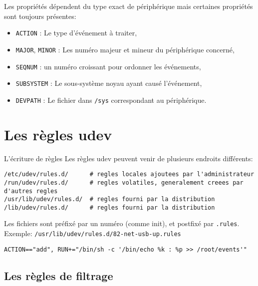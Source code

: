 \documentclass[compress,aspectratio=169]{beamer}
\begin{document}
\begin{frame}[fragile]
Les propriétés dépendent du type exact de périphérique mais certaines propriétés sont toujours présentes:
\begin{itemize}
    \item \texttt{ACTION} : Le type d’événement à traiter,
    \item \texttt{MAJOR}, \texttt{MINOR} : Les numéro majeur et mineur du périphérique concerné,
    \item \texttt{SEQNUM} : un numéro croissant pour ordonner les événements,
    \item \texttt{SUBSYSTEM} : Le sous-système noyau ayant causé l’événement,
    \item \texttt{DEVPATH} : Le fichier dans \texttt{/sys} correspondant au périphérique.
\end{itemize}
\end{frame}


\section{Les règles udev}

\begin{frame}[fragile]{L’écriture de règles}
Les règles udev peuvent venir de plusieurs endroits différents:
\begin{lstlisting}[style=shell,basicstyle=\tiny\ttfamily\color{white}]
/etc/udev/rules.d/      # regles locales ajoutees par l'administrateur
/run/udev/rules.d/      # regles volatiles, generalement creees par d'autres regles
/usr/lib/udev/rules.d/  # regles fourni par la distribution
/lib/udev/rules.d/      # regles fourni par la distribution
\end{lstlisting}

Les fichiers sont préfixé par un numéro (comme init), et postfixé par \texttt{.rules}.\newline
Exemple: \texttt{/usr/lib/udev/rules.d/82-net-usb-up.rules}
\begin{lstlisting}[style=shell]
ACTION=="add", RUN+="/bin/sh -c '/bin/echo %k : %p >> /root/events'"
\end{lstlisting}
\end{frame}

\subsection{Les règles de filtrage}
\end{document}
